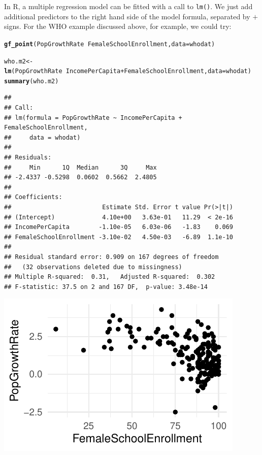 \documentclass[twoside]{book}\usepackage[]{graphicx}\usepackage[]{xcolor}
\makeatletter
\def\maxwidth{ %
  \ifdim\Gin@nat@width>\linewidth
    \linewidth
  \else
    \Gin@nat@width
  \fi
}
\newcommand{\hlopt}[1]{\textcolor[rgb]{0,0,0}{#1}}%
\newcommand{\hlstd}[1]{\textcolor[rgb]{0.345,0.345,0.345}{#1}}%
\newcommand{\hlkwb}[1]{\textcolor[rgb]{0.69,0.353,0.396}{#1}}%
\newcommand{\hlkwc}[1]{\textcolor[rgb]{0.333,0.667,0.333}{#1}}%
\newcommand{\hlkwd}[1]{\textcolor[rgb]{0.737,0.353,0.396}{\textbf{#1}}}%
\newenvironment{kframe}{%
 \def\at@end@of@kframe{}%
 \ifinner\ifhmode%
  \def\at@end@of@kframe{\end{minipage}}%
  \begin{minipage}{\columnwidth}%
 \fi\fi%
 \def\FrameCommand##1{\hskip\@totalleftmargin \hskip-\fboxsep
 \colorbox{shadecolor}{##1}\hskip-\fboxsep
     \hskip-\linewidth \hskip-\@totalleftmargin \hskip\columnwidth}%
 \MakeFramed {\advance\hsize-\width
   \@totalleftmargin\z@ \linewidth\hsize
   \@setminipage}}%
 {\par\unskip\endMakeFramed%
 \at@end@of@kframe}
\newenvironment{knitrout}{}{} %
\newcounter{example}[section]
\makeatother
\begin{document}
In R, a multiple regression model can be fitted with a call to \texttt{lm()}.  We just add additional predictors to the right hand side of the model formula, separated by $+$ signs. For the WHO example discussed above, for example, we could try:
\begin{knitrout}
\color{fgcolor}\begin{kframe}
\begin{alltt}
\hlkwd{gf_point}\hlstd{(PopGrowthRate} \hlopt{~} \hlstd{FemaleSchoolEnrollment,} \hlkwc{data} \hlstd{= whodat)}
\end{alltt}


{\ttfamily\noindent\color{warningcolor}{\#\# Warning: Removed 23 rows containing missing values (geom\_point).}}\begin{alltt}
\hlstd{who.m2} \hlkwb{<-} \hlkwd{lm}\hlstd{(PopGrowthRate} \hlopt{~} \hlstd{IncomePerCapita} \hlopt{+} \hlstd{FemaleSchoolEnrollment,} \hlkwc{data} \hlstd{= whodat)}
\hlkwd{summary}\hlstd{(who.m2)}
\end{alltt}
\begin{verbatim}
## 
## Call:
## lm(formula = PopGrowthRate ~ IncomePerCapita + FemaleSchoolEnrollment, 
##     data = whodat)
## 
## Residuals:
##     Min      1Q  Median      3Q     Max 
## -2.4337 -0.5298  0.0602  0.5662  2.4805 
## 
## Coefficients:
##                         Estimate Std. Error t value Pr(>|t|)
## (Intercept)             4.10e+00   3.63e-01   11.29  < 2e-16
## IncomePerCapita        -1.10e-05   6.03e-06   -1.83    0.069
## FemaleSchoolEnrollment -3.10e-02   4.50e-03   -6.89  1.1e-10
## 
## Residual standard error: 0.909 on 167 degrees of freedom
##   (32 observations deleted due to missingness)
## Multiple R-squared:  0.31,	Adjusted R-squared:  0.302 
## F-statistic: 37.5 on 2 and 167 DF,  p-value: 3.48e-14
\end{verbatim}
\end{kframe}

{\centering \includegraphics[width=\maxwidth]{figures/fig-who-slm2-1} 

}



\end{knitrout}
\end{document}
